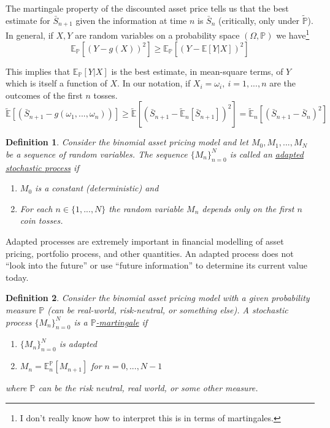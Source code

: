 \documentclass[12pt]{article}
\newtheorem{definition}{Definition}
\newlength\tindent
\renewcommand{\indent}{\hspace*{\tindent}}
\renewcommand{\P}{\mathbb P}
\newcommand{\E}{\mathbb E}
\begin{document}
\indent The martingale property of the discounted asset price tells us that the best estimate for $\bar{S}_{n + 1}$ given the information at time $n$ is $\bar{S}_n$ (critically, only under $\tilde{\P}$). In general, if $X, Y$ are random variables on a probability space $(\Omega,\P)$ we have\footnote{I don't really know how to interpret this is in terms of martingales.}
\begin{equation*}
	\E_\P[(Y - g(X))^2] \geq \E_\P[(Y - \E[Y|X])^2]
\end{equation*}

\indent This implies that $\E_\P[Y|X]$ is the best estimate, in mean-square terms, of $Y$ which is itself a function of $X$. In our notation, if $X_i = \omega_i,~i = 1,..., n$ are the outcomes of the first $n$ tosses.
\begin{equation*}
	\tilde{\E}[(\bar{S}_{n + 1} - g(\omega_1,...,\omega_n))] \geq \tilde{\E}[(\bar{S}_{n + 1} - \tilde{\E}_n[\bar{S}_{n + 1}])^2] = \tilde{\E}_n[(\bar{S}_{n + 1} - \bar{S}_n)^2]
\end{equation*}

\begin{definition} Consider the binomial asset pricing model and let $M_0, M_1, ..., M_N$ be a sequence of random variables. The sequence $\{M_n\}^N_{n = 0}$ is called an \underline{adapted stochastic process} if 
\begin{enumerate}
	\item $M_0$ is a constant (deterministic) and
	\item For each $n \in \{1, ..., N\}$ the random variable $M_n$ depends only on the first $n$ coin tosses.
\end{enumerate}
\end{definition}

\indent Adapted processes are extremely important in financial modelling of asset pricing, portfolio process, and other quantities. An adapted process does not ``look into the future'' or use ``future information'' to determine its current value today.

\begin{definition} Consider the binomial asset pricing model with a given probability measure $\P$ (can be real-world, risk-neutral, or something else). A stochastic process $\{M_n\}^N_{n = 0}$ is a \underline{$\P$-martingale} if
\begin{enumerate}
	\item $\{M_n\}_{n = 0}^N$ is adapted
	\item $M_n = \E^\P_n[M_{n + 1}]$ for $n = 0, ..., N - 1$
\end{enumerate}

where $\P$ can be the risk neutral, real world, or some other measure.
\end{definition}
\end{document}
